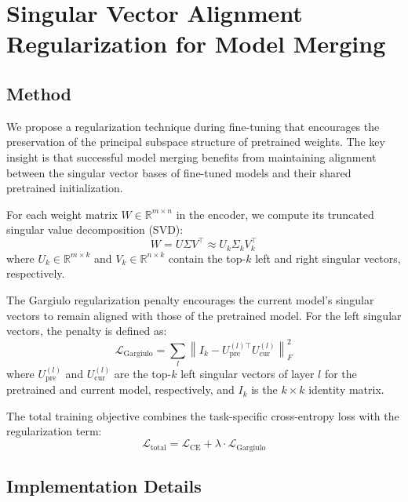 \section{Singular Vector Alignment Regularization for Model Merging}
\label{sec:gargiulo_regularization}

\subsection{Method}

We propose a regularization technique during fine-tuning that encourages the preservation of the principal subspace structure of pretrained weights. The key insight is that successful model merging benefits from maintaining alignment between the singular vector bases of fine-tuned models and their shared pretrained initialization.

For each weight matrix $W \in \mathbb{R}^{m \times n}$ in the encoder, we compute its truncated singular value decomposition (SVD):
\begin{equation}
W = U \Sigma V^\top \approx U_k \Sigma_k V_k^\top
\end{equation}
where $U_k \in \mathbb{R}^{m \times k}$ and $V_k \in \mathbb{R}^{n \times k}$ contain the top-$k$ left and right singular vectors, respectively.

The Gargiulo regularization penalty encourages the current model's singular vectors to remain aligned with those of the pretrained model. For the left singular vectors, the penalty is defined as:
\begin{equation}
\mathcal{L}_{\text{Gargiulo}} = \sum_{l} \left\| I_k - U_{\text{pre}}^{(l)\top} U_{\text{cur}}^{(l)} \right\|_F^2
\end{equation}
where $U_{\text{pre}}^{(l)}$ and $U_{\text{cur}}^{(l)}$ are the top-$k$ left singular vectors of layer $l$ for the pretrained and current model, respectively, and $I_k$ is the $k \times k$ identity matrix.

The total training objective combines the task-specific cross-entropy loss with the regularization term:
\begin{equation}
\mathcal{L}_{\text{total}} = \mathcal{L}_{\text{CE}} + \lambda \cdot \mathcal{L}_{\text{Gargiulo}}
\end{equation}

\subsection{Implementation Details}

